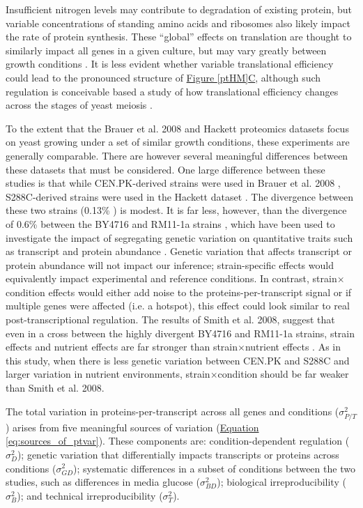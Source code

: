 Insufficient nitrogen levels may contribute to degradation of existing protein, but variable concentrations of standing amino acids and ribosomes also likely impact the rate of protein synthesis. These ``global'' effects on translation are thought to similarly impact all genes in a given culture, but may vary greatly between growth conditions \cite{Klumpp:2009ic}. It is less evident whether variable translational efficiency could lead to the pronounced structure of \hyperref[ptHM]{Figure \ref{ptHM}C}, although such regulation is conceivable based a study of how translational efficiency changes across the stages of yeast meiosis \cite{Brar:2012ig}. 

To the extent that the Brauer et al. 2008 and Hackett proteomics datasets focus on yeast growing under a set of similar growth conditions, these experiments are generally comparable. There are however several meaningful differences between these datasets that must be considered. One large difference between these studies is that while CEN.PK-derived strains were used in Brauer et al. 2008 \cite{vanDijkenJP:2000er}, S288C-derived strains were used in the Hackett dataset \cite{Winston:1995io}. The divergence between these two strains (0.13\% \cite{Schacherer:2007ck}) is modest. It is far less, however, than the divergence of 0.6\% between the BY4716 and RM11-1a strains \cite{Foss:2007ej}, which have been used to investigate the impact of segregating genetic variation on quantitative traits such as transcript and protein abundance \cite{Brem:2005gh, Foss:2007ej}. Genetic variation that affects transcript or protein abundance will not impact our inference; strain-specific effects would equivalently impact experimental and reference conditions. In contrast, strain$\times$condition effects would either add noise to the proteins-per-transcript signal or if multiple genes were affected (i.e. a hotspot), this effect could look similar to real post-transcriptional regulation. The results of Smith et al. 2008, suggest that even in a cross between the highly divergent BY4716 and RM11-1a strains, strain effects and nutrient effects are far stronger than strain$\times$nutrient effects \cite{Smith:2008vy}. As in this study, when there is less genetic variation between CEN.PK and S288C and larger variation in nutrient environments, strain$\times$condition should be far weaker than Smith et al. 2008.

The total variation in proteins-per-transcript across all genes and conditions ($\sigma^{2}_{P/T}$) arises from five meaningful sources of variation (\hyperref[eq:sources_of_ptvar]{Equation \ref{eq:sources_of_ptvar}}). These components are: condition-dependent regulation ($\sigma^{2}_{D}$); genetic variation that differentially impacts transcripts or proteins across conditions ($\sigma^{2}_{GD}$); systematic differences in a subset of conditions between the two studies, such as differences in media glucose ($\sigma^{2}_{BD}$); biological irreproducibility ($\sigma^{2}_{B}$); and technical irreproducibility ($\sigma^{2}_{T}$).

